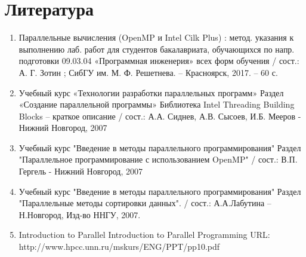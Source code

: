 \documentclass{report}
\begin{document}
\section*{Литература}
\begin{enumerate}
\item Параллельные вычисления (OpenMP и Intel Cilk Plus) : метод.
указания к выполнению лаб. работ для студентов бакалавриата, обучающихся по напр. подготовки 09.03.04 «Программная инженерия» всех форм
обучения / сост.: А. Г. Зотин ; СибГУ им. М. Ф. Решетнева. – Красноярск,
2017. – 60 с.
\item Учебный курс «Технологии разработки параллельных программ» Раздел «Создание параллельной программы» Библиотека Intel Threading Building Blocks – краткое описание / сост.: А.А. Сиднев, А.В. Сысоев, И.Б. Мееров - Нижний Новгород, 2007 
\item Учебный курс "Введение в методы параллельного
программирования" Раздел "Параллельное программирование с использованием
OpenMP"  / сост.: В.П. Гергель - Нижний Новгород, 2007 
\item Учебный курс "Введение в методы параллельного программирования"
Раздел "Параллельные методы сортировки данных". / сост.: А.А.Лабутина – Н.Новгород, Изд-во ННГУ, 2007.
\item Introduction to Parallel Introduction to Parallel
Programming \newline URL: http://www.hpcc.unn.ru/mskurs/ENG/PPT/pp10.pdf
\end{enumerate} 
\newpage

\end{document}
